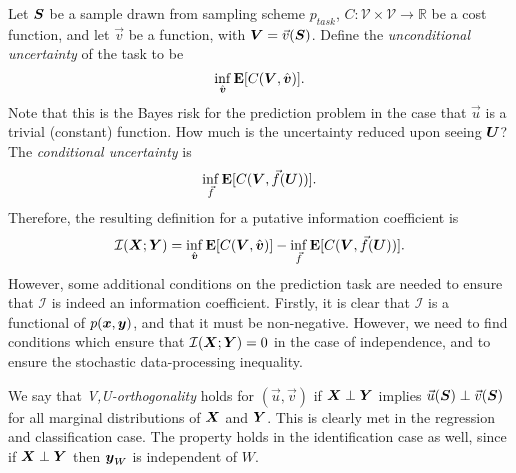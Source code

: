 \documentclass[12pt]{article}
\begin{document}
Let $\boldsymbol{S}$ be a sample drawn from sampling scheme $p_{task}$,
$C: \mathcal{V} \times \mathcal{V} \to \mathbb{R}$ be a cost function,
and let $\vec{v}$ be a function, with $\boldsymbol{V} = \vec{v}(\boldsymbol{S})$.  Define
the \emph{unconditional uncertainty} of the task to be
\[
\inf_{\hat{\boldsymbol{v}}} \textbf{E}[C(\boldsymbol{V}, \hat{\boldsymbol{v}})].
\]
Note that this is the Bayes risk for the prediction problem in the
case that $\vec{u}$ is a trivial (constant) function.
How much is the uncertainty reduced upon seeing $\boldsymbol{U}$?
The \emph{conditional uncertainty} is
\[
\inf_{\vec{f}} \textbf{E}[C(\boldsymbol{V}, \vec{f}(\boldsymbol{U}))].
\]
Therefore, the resulting definition for a putative information coefficient is
\[
\mathcal{I}(\boldsymbol{X}; \boldsymbol{Y}) = \inf_{\hat{\boldsymbol{v}}} \textbf{E}[C(\boldsymbol{V}, \hat{\boldsymbol{v}})] - \inf_{\vec{f}} \textbf{E}[C(\boldsymbol{V}, \vec{f}(\boldsymbol{U}))].
\]
However, some additional conditions on the prediction task are needed
to ensure that $\mathcal{I}$ is indeed an information coefficient.
Firstly, it is clear that $\mathcal{I}$ is a functional of
$p(\boldsymbol{x}, \boldsymbol{y})$, and that it must be non-negative.  However, we need to
find conditions which ensure that $\mathcal{I}(\boldsymbol{X}; \boldsymbol{Y}) = 0$ in the
case of independence, and to ensure the stochastic data-processing
inequality.

We say that \emph{V,U-orthogonality} holds for $(\vec{u}, \vec{v})$ if
$\boldsymbol{X} \perp \boldsymbol{Y}$ implies $\vec{u}(\boldsymbol{S}) \perp \vec{v}(\boldsymbol{S})$ for all
marginal distributions of $\boldsymbol{X}$ and $\boldsymbol{Y}$.  
This is clearly met in the regression and classification case.  The
property holds in the identification case as well, since if
$\boldsymbol{X} \perp \boldsymbol{Y}$ then $\boldsymbol{y}_W$ is independent of $W$.
\end{document}
